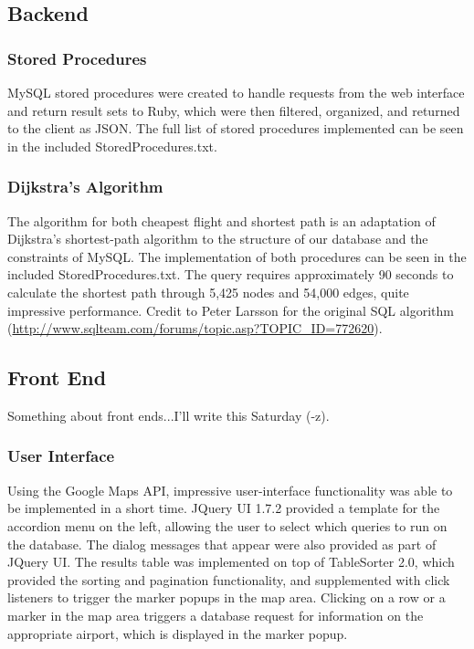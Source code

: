 \documentclass[12pt, letterpaper]{article}
\begin{document}
\subsection{Backend}

\subsubsection{Stored Procedures}
MySQL stored procedures were created to handle requests from the web interface and return result sets to Ruby, which were then filtered, organized, and returned to the client as JSON. The full list of stored procedures implemented can be seen in the included StoredProcedures.txt.

\subsubsection{Dijkstra's Algorithm}
The algorithm for both cheapest flight and shortest path is an adaptation of Dijkstra's shortest-path algorithm to the structure of our database and the constraints of MySQL. The implementation of both procedures can be seen in the included StoredProcedures.txt.  The query requires approximately 90 seconds to calculate the shortest path through 5,425 nodes and 54,000 edges, quite impressive performance. Credit to Peter Larsson for the original SQL algorithm (\mbox{\url{http://www.sqlteam.com/forums/topic.asp?TOPIC_ID=772620}}).

\subsection{Front End}
Something about front ends...I'll write this Saturday (-z).

\subsubsection{User Interface}
Using the Google Maps API, impressive user-interface functionality was able to be implemented in a short time. JQuery UI 1.7.2 provided a template for the accordion menu on the left, allowing the user to select which queries to run on the database. The dialog messages that appear were also provided as part of JQuery UI. The results table was implemented on top of TableSorter 2.0, which provided the sorting and pagination functionality, and supplemented with click listeners to trigger the marker popups in the map area. Clicking on a row or a marker in the map area triggers a database request for information on the appropriate airport, which is displayed in the marker popup.
\end{document}
